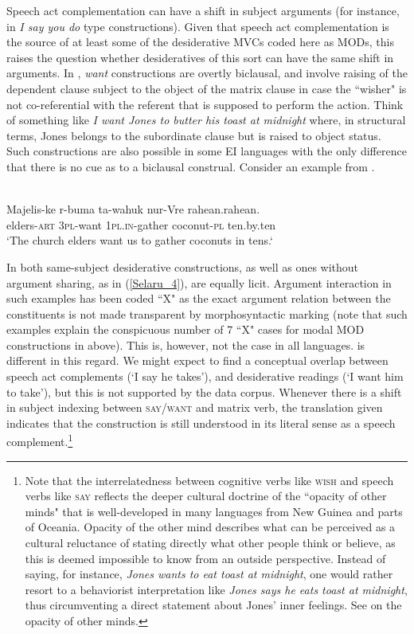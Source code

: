 Speech act complementation can have a shift in subject arguments (for instance, in \textit{I say you do} type constructions). Given that speech act complementation is the source of at least some of the desiderative MVCs coded here as MODs, this raises the question whether desideratives of this sort can have the same shift in arguments. In , \textit{want} constructions are overtly biclausal, and involve raising of the dependent clause subject to the object of the matrix clause in case the ``wisher" is not co-referential with the referent that is supposed to perform the action. Think of something like \textit{I want Jones to butter his toast at midnight} where, in structural terms, Jones belongs to the subordinate clause but is raised to object status. Such constructions are also possible in some EI languages with the only difference that there is no cue as to a biclausal construal. Consider an example from .

\ea \label{Selaru_4}
\\
\gll Majelis-ke r-buma ta-wahuk nur-Vre rahean.rahean. \\
elders-\textsc{art} 3\textsc{pl}-want 1\textsc{pl}.\textsc{in}-gather coconut-\textsc{pl} ten.by.ten \\
\glft `The church elders want us to gather coconuts in tens.‘\\ 
\z

In  both same-subject desiderative constructions, as well as ones without argument sharing, as in (\ref{Selaru_4}), are equally licit. Argument interaction in such examples has been coded ``X" as the exact argument relation between the constituents is not made transparent by morphosyntactic marking (note that such examples explain the conspicuous number of 7 ``X" cases for modal MOD constructions in  above). This is, however, not the case in all languages.  is different in this regard. We might expect to find a conceptual overlap between speech act complements (`I say he takes'), and desiderative readings (`I want him to take'), but this is not supported by the  data corpus. Whenever there is a shift in subject indexing between \textsc{say}/\textsc{want} and matrix verb, the translation given indicates that the construction is still understood in its literal sense as a speech complement.\footnote{Note that the interrelatedness between cognitive verbs like \textsc{wish} and speech verbs like \textsc{say} reflects the deeper cultural doctrine of the ``opacity of other minds" that is well-developed in many languages from New Guinea and parts of Oceania. Opacity of the other mind describes what can be perceived as a cultural reluctance of stating directly what other people think or believe, as this is deemed impossible to know from an outside perspective. Instead of saying, for instance, \textit{Jones wants to eat toast at midnight}, one would rather resort to a behaviorist interpretation \citep{robbins2008not} like \textit{Jones says he eats toast at midnight}, thus circumventing a direct statement about Jones' inner feelings. See \citet{robbins2008introduction, robbins2008not, rumsey2013intersubjectivity} on the opacity of other minds.}

